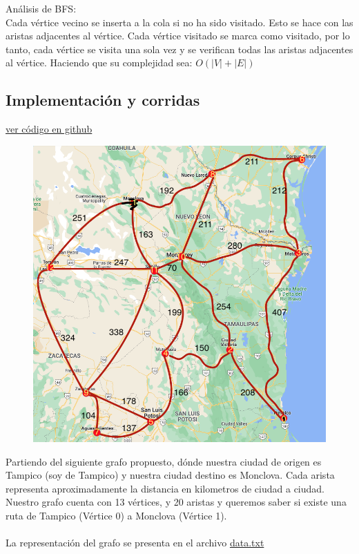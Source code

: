 \documentclass{article}
\begin{document}
Análisis de BFS:\\

Cada vértice vecino se inserta a la cola si no ha sido visitado. Esto se hace con las aristas adjacentes al vértice. Cada vértice visitado se marca como visitado, por lo tanto, cada vértice se visita una sola vez y se verifican todas las aristas adjacentes al vértice. Haciendo que su complejidad sea: $O(|V|+|E|)$

\subsection{Implementación y corridas}

\href{https://github.com/luisballado/ADA/tree/main/practice_code/tarea5/car_highways}{ver código en github}\\

\begin{figure}[h]
  \includegraphics[scale=0.5]{grafo.png}
  \centering
\end{figure}

Partiendo del siguiente grafo propuesto, dónde nuestra ciudad de origen es Tampico (soy de Tampico) y nuestra ciudad destino es Monclova. Cada arista representa aproximadamente la distancia en kilometros de ciudad a ciudad.\\
Nuestro grafo cuenta con 13 vértices, y 20 aristas y queremos saber si existe una ruta de Tampico (Vértice 0) a Monclova (Vértice 1).\\\\
La representación del grafo se presenta en el archivo \href{https://github.com/luisballado/ADA/blob/main/practice_code/tarea5/currency_trading/data.txt}{data.txt}\\
\end{document}
